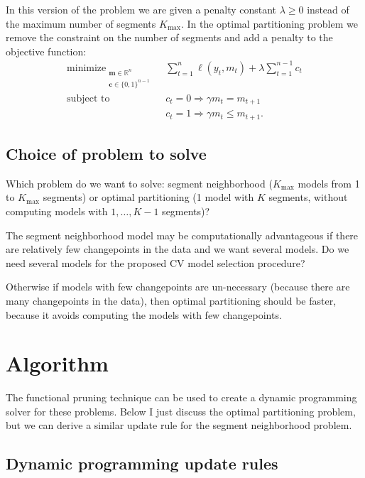\documentclass{article}
\DeclareMathOperator*{\minimize}{minimize}
\DeclareMathOperator*{\subjectto}{subject\ to}
\newcommand{\RR}{\mathbb R}
\begin{document}
In this version of the problem we are given a penalty constant
$\lambda\geq 0$ instead of the maximum number of segments
$K_{\text{max}}$. In the optimal partitioning problem we remove the
constraint on the number of segments and add a penalty to the
objective function:
\begin{align}
  \label{eq:optimal-partitioning}
  \minimize_{
    \substack{
    \mathbf m\in\RR^n\\
\mathbf c\in\{0,1\}^{n-1}
}
    } &\ \ 
  \sum_{t=1}^n \ell(y_t, m_t) + \lambda \sum_{t=1}^{n-1} c_t \\
\subjectto
 &\ \ c_t = 0 \Rightarrow \gamma m_t = m_{t+1}
  \nonumber\\
&\ \ c_t = 1 \Rightarrow \gamma m_t \leq m_{t+1}.
\nonumber
\nonumber
\end{align}

\subsection{Choice of problem to solve}

Which problem do we want to solve: segment neighborhood
($K_{\text{max}}$ models from 1 to $K_{\text{max}}$ segments) or
optimal partitioning (1 model with $K$ segments, without computing
models with $1,\dots,K-1$ segments)?

The segment neighborhood model may be computationally advantageous if
there are relatively few changepoints in the data and we want several
models. Do we need several models for the proposed CV model selection
procedure? 

Otherwise if models with few changepoints are un-necessary (because
there are many changepoints in the data), then optimal partitioning
should be faster, because it avoids computing the models with few
changepoints.

\section{Algorithm}
The functional pruning technique can be used to create a dynamic
programming solver for these problems. Below I just discuss the optimal
partitioning problem, but we can derive a similar update rule for the
segment neighborhood problem.

\subsection{Dynamic programming update rules}
\end{document}
